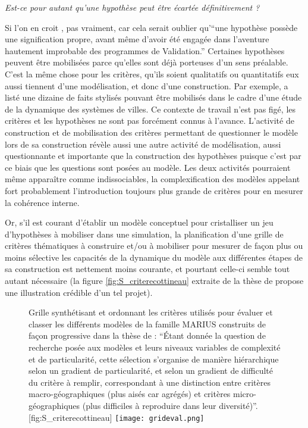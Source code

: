 \medskip

\textit{Est-ce pour autant qu'une hypothèse peut être écartée définitivement ?}

\medskip

Si l'on en croit \textcite[17]{Besse2000}, pas vraiment, car cela serait oublier qu'\enquote{une hypothèse possède une signification propre, avant même d’avoir été engagée dans l’aventure hautement improbable des programmes de Validation.} Certaines hypothèses peuvent être mobilisées parce qu'elles sont déjà porteuses d'un sens préalable. C'est la même chose pour les critères, qu'ils soient qualitatifs ou quantitatifs eux aussi tiennent d'une modélisation, et donc d'une construction. Par exemple, \textcite[80]{Schmitt2014} a listé une dizaine de faits stylisés pouvant être mobilisés dans le cadre d'une étude de la dynamique des systèmes de villes. Ce contexte de travail n'est pas figé, les critères et les hypothèses ne sont pas forcément connus à l'avance. L'activité de construction et de mobilisation des critères permettant de questionner le modèle lors de sa construction révèle aussi une autre activité de modélisation, aussi questionnante et importante que la construction des hypothèses puisque c'est par ce biais que les questions sont posées au modèle. Les deux activités pourraient même apparaître comme indissociables, la complexification des modèles appelant fort probablement l'introduction toujours plus grande de critères pour en mesurer la cohérence interne.

Or, s'il est courant d'établir un modèle conceptuel pour cristalliser un jeu d'hypothèses à mobiliser dans une simulation, la planification d'une grille de critères thématiques à construire et/ou à mobiliser pour mesurer de façon plus ou moins sélective les capacités de la dynamique du modèle aux différentes étapes de sa construction est nettement moins courante, et pourtant celle-ci semble tout autant nécessaire (la figure \ref{fig:S_criterecottineau} extraite de la thèse de \textcite{Cottineau2014b} propose une illustration crédible d'un tel projet).

\begin{figure}[htbp]
\begin{sidecaption}{Grille synthétisant et ordonnant les critères utilisés pour évaluer et classer les différents modèles de la famille MARIUS construits de façon progressive dans la thèse de \textcite[329]{Cottineau2014b} : \enquote{Étant donnée la question de recherche posée aux modèles et leurs niveaux variables de complexité et de particularité, cette sélection s’organise de manière hiérarchique selon un gradient de particularité, et selon un gradient de difficulté du critère à remplir, correspondant à une distinction entre critères macro-géographiques (plus aisés car agrégés) et critères micro-géographiques (plus difficiles à reproduire dans leur diversité)}.}[fig:S_criterecottineau]
  \centering
 \texttt{[image: grideval.png]}
  \end{sidecaption}
\end{figure}

